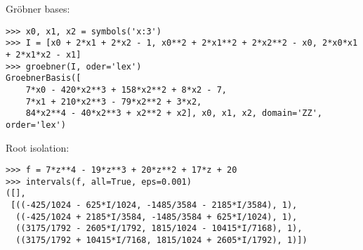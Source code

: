\noindent Gröbner bases:
\begin{verbatim}
>>> x0, x1, x2 = symbols('x:3')
>>> I = [x0 + 2*x1 + 2*x2 - 1, x0**2 + 2*x1**2 + 2*x2**2 - x0, 2*x0*x1 + 2*x1*x2 - x1]
>>> groebner(I, oder='lex')
GroebnerBasis([
    7*x0 - 420*x2**3 + 158*x2**2 + 8*x2 - 7,
    7*x1 + 210*x2**3 - 79*x2**2 + 3*x2,
    84*x2**4 - 40*x2**3 + x2**2 + x2], x0, x1, x2, domain='ZZ', order='lex')
\end{verbatim}

\noindent Root isolation:
\begin{verbatim}
>>> f = 7*z**4 - 19*z**3 + 20*z**2 + 17*z + 20
>>> intervals(f, all=True, eps=0.001)
([],
 [((-425/1024 - 625*I/1024, -1485/3584 - 2185*I/3584), 1),
  ((-425/1024 + 2185*I/3584, -1485/3584 + 625*I/1024), 1),
  ((3175/1792 - 2605*I/1792, 1815/1024 - 10415*I/7168), 1),
  ((3175/1792 + 10415*I/7168, 1815/1024 + 2605*I/1792), 1)])
\end{verbatim}
